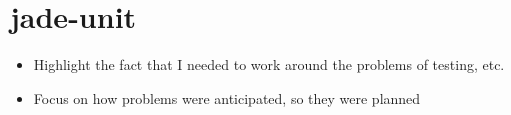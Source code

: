 \section{jade-unit}

\begin{itemize}
\item Highlight the fact that I needed to work around the problems of testing, etc.
\item Focus on how problems were anticipated, so they were planned
\end{itemize}